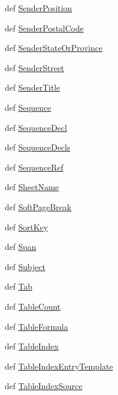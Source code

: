 \begin{DoxyCompactItemize}
\item 
def \hyperlink{namespaceodf_1_1text_ab089c77398447ca9e35d1bfb27a6471b}{Sender\+Position}
\item 
def \hyperlink{namespaceodf_1_1text_a1e23f66d453ccb70cae1fcccc695c21f}{Sender\+Postal\+Code}
\item 
def \hyperlink{namespaceodf_1_1text_a0d26378562d771a7f4e2514afeea1aa4}{Sender\+State\+Or\+Province}
\item 
def \hyperlink{namespaceodf_1_1text_a80eb062395f59a84474bfcf92efef47f}{Sender\+Street}
\item 
def \hyperlink{namespaceodf_1_1text_a1a962808ab3ff9cace27ca11aec4fcd2}{Sender\+Title}
\item 
def \hyperlink{namespaceodf_1_1text_ae3d45e9e434a9f620a9084d1baf13aa1}{Sequence}
\item 
def \hyperlink{namespaceodf_1_1text_a798f5ec5f87ec6248fe8bdfbf2f9f330}{Sequence\+Decl}
\item 
def \hyperlink{namespaceodf_1_1text_ac063bfaa0fd25e3c764bbea85131747a}{Sequence\+Decls}
\item 
def \hyperlink{namespaceodf_1_1text_ab85be78d82c069b381ec107a6cbcd395}{Sequence\+Ref}
\item 
def \hyperlink{namespaceodf_1_1text_ac5b12117e52f90da70e4b7de26e4c13b}{Sheet\+Name}
\item 
def \hyperlink{namespaceodf_1_1text_ac0003d823018a256f7979a5e59c9bf69}{Soft\+Page\+Break}
\item 
def \hyperlink{namespaceodf_1_1text_aaaef31f17e00d2e45ed76c9e8ea77f3a}{Sort\+Key}
\item 
def \hyperlink{namespaceodf_1_1text_a10f00500fe333157f641e97c366f6263}{Span}
\item 
def \hyperlink{namespaceodf_1_1text_aa37310f0331ca849dce3834e533fe806}{Subject}
\item 
def \hyperlink{namespaceodf_1_1text_aa57801d19e9bdf60df01e5e69fa09241}{Tab}
\item 
def \hyperlink{namespaceodf_1_1text_a5c2e912dc88105908fb16540abb6b836}{Table\+Count}
\item 
def \hyperlink{namespaceodf_1_1text_a52f8e730deaadd1c03dfb455203da0df}{Table\+Formula}
\item 
def \hyperlink{namespaceodf_1_1text_a3b017f7d8ddb32a13c86ff6e4dffaf39}{Table\+Index}
\item 
def \hyperlink{namespaceodf_1_1text_a61a028756057c3b41ec5f3c6228e3fb2}{Table\+Index\+Entry\+Template}
\item 
def \hyperlink{namespaceodf_1_1text_aee13e59c7a4f1dbd6ddf66601b225e8f}{Table\+Index\+Source}

\end{DoxyCompactItemize}
